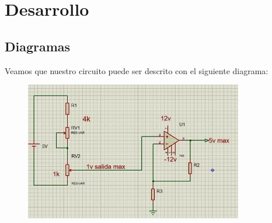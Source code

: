 \documentclass[12pt, fleqn]{article}                            %
\theoremstyle{break}                                            %
\begin{document}
\clearpage
\section{Desarrollo}


    \subsection{Diagramas}

        Veamos que nuestro circuito puede ser descrito con el siguiente diagrama:
        \begin{figure}[h]
            \centering
            \includegraphics[width=0.85\textwidth]{Diagrama3}
        \end{figure}
\end{document}

